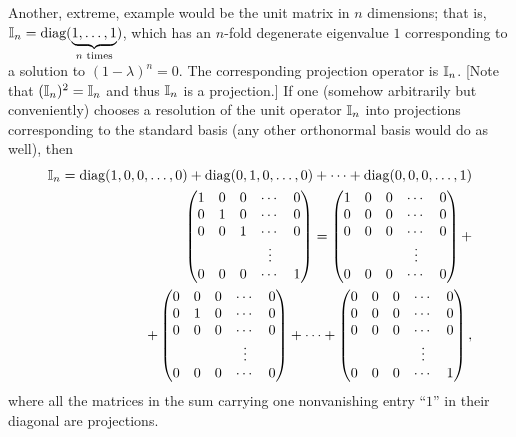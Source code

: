 {Another, extreme, example would be the unit matrix in $n$ dimensions; that is,
${\Bbb I}_n=\textrm{diag}(\underbrace{1,\ldots ,1}_{n \textrm{ times}})$,
which has an $n$-fold degenerate eigenvalue $1$ corresponding to a solution to
$(1-\lambda )^n=0$.
The corresponding projection operator is ${\Bbb I}_n$.  [Note that $({\Bbb I}_n)^2 ={\Bbb I}_n$
and thus ${\Bbb I}_n$ is a projection.]
If one (somehow arbitrarily but conveniently) chooses a resolution of the unit operator ${\Bbb I}_n$
into projections corresponding to the standard basis (any other orthonormal basis would do as well),
then
\begin{equation}
\begin{split}
{\Bbb I}_n = \textrm{diag}( 1,0,0,\ldots ,0 )
+   \textrm{diag}( 0,1,0,\ldots ,0 )
+ \cdots
+   \textrm{diag}( 0,0,0,\ldots ,1 )\\
\begin{pmatrix}
 1&0&0&\cdots &0\\
 0&1&0&\cdots &0\\
 0&0&1&\cdots &0\\
&&&\vdots&\\
 0&0&0&\cdots &1
\end{pmatrix}  =
\begin{pmatrix}
 1&0&0&\cdots &0\\
 0&0&0&\cdots &0\\
 0&0&0&\cdots &0\\
&&&\vdots&\\
 0&0&0&\cdots &0
\end{pmatrix}  +
\\
\quad
+%
\begin{pmatrix}
 0&0&0&\cdots &0\\
 0&1&0&\cdots &0\\
 0&0&0&\cdots &0\\
&&&\vdots&\\
 0&0&0&\cdots &0
\end{pmatrix} +\cdots
+%
\begin{pmatrix}
 0&0&0&\cdots &0\\
 0&0&0&\cdots &0\\
 0&0&0&\cdots &0\\
&&&\vdots&\\
 0&0&0&\cdots &1
\end{pmatrix}
,
\end{split}
\end{equation}
where all the matrices in the sum carrying one nonvanishing entry ``$1$''
in their diagonal are  projections.
}
